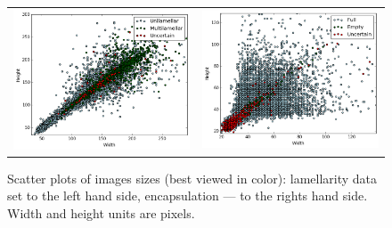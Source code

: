 \documentclass[a4paper, 11pt, table]{article}
\begin{document}
\begin{figure}[H]
\centering
\begin{tabular}{cc}
\includegraphics[scale=0.32]{img_size/lamellarity/scatter_plot_width_height.png} & \includegraphics[scale=0.32]{img_size/encapsulation/scatter_plot_width_height.png}
\end{tabular}
\caption{Scatter plots of images sizes (best viewed in color): lamellarity data set to the left hand side, encapsulation --- to the rights hand side. Width and height units are pixels.}
\label{fig:img_size_scatter_plot}
\end{figure}
\end{document}
